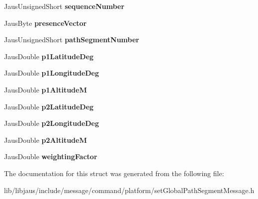 \begin{DoxyCompactItemize}
\item 
\hypertarget{struct_set_global_path_segment_message_struct_a77d09e2a5e7c9649d741216e18d5fd7a}{\-Jaus\-Unsigned\-Short {\bfseries sequence\-Number}}\label{struct_set_global_path_segment_message_struct_a77d09e2a5e7c9649d741216e18d5fd7a}

\item 
\hypertarget{struct_set_global_path_segment_message_struct_aee65fc15fa1f156df47e0302ad3783e5}{\-Jaus\-Byte {\bfseries presence\-Vector}}\label{struct_set_global_path_segment_message_struct_aee65fc15fa1f156df47e0302ad3783e5}

\item 
\hypertarget{struct_set_global_path_segment_message_struct_a3ea2f0bcc2af72850c9f4852a8bd0476}{\-Jaus\-Unsigned\-Short {\bfseries path\-Segment\-Number}}\label{struct_set_global_path_segment_message_struct_a3ea2f0bcc2af72850c9f4852a8bd0476}

\item 
\hypertarget{struct_set_global_path_segment_message_struct_ab98584847911c1f87a1583da59801956}{\-Jaus\-Double {\bfseries p1\-Latitude\-Deg}}\label{struct_set_global_path_segment_message_struct_ab98584847911c1f87a1583da59801956}

\item 
\hypertarget{struct_set_global_path_segment_message_struct_af777dcb3f6d215f126c52972905e7ef4}{\-Jaus\-Double {\bfseries p1\-Longitude\-Deg}}\label{struct_set_global_path_segment_message_struct_af777dcb3f6d215f126c52972905e7ef4}

\item 
\hypertarget{struct_set_global_path_segment_message_struct_a5945323860d7d1cea3ce2a7cdeb5eb4f}{\-Jaus\-Double {\bfseries p1\-Altitude\-M}}\label{struct_set_global_path_segment_message_struct_a5945323860d7d1cea3ce2a7cdeb5eb4f}

\item 
\hypertarget{struct_set_global_path_segment_message_struct_ae2f8a54197dd1e5d2d18546a488dbb40}{\-Jaus\-Double {\bfseries p2\-Latitude\-Deg}}\label{struct_set_global_path_segment_message_struct_ae2f8a54197dd1e5d2d18546a488dbb40}

\item 
\hypertarget{struct_set_global_path_segment_message_struct_a3752cc0821b43f2b65356d724d9b49c9}{\-Jaus\-Double {\bfseries p2\-Longitude\-Deg}}\label{struct_set_global_path_segment_message_struct_a3752cc0821b43f2b65356d724d9b49c9}

\item 
\hypertarget{struct_set_global_path_segment_message_struct_ad566f39940429f8c5661d14d92190611}{\-Jaus\-Double {\bfseries p2\-Altitude\-M}}\label{struct_set_global_path_segment_message_struct_ad566f39940429f8c5661d14d92190611}

\item 
\hypertarget{struct_set_global_path_segment_message_struct_a0b878751ebd82077aa39bd9710195c8e}{\-Jaus\-Double {\bfseries weighting\-Factor}}\label{struct_set_global_path_segment_message_struct_a0b878751ebd82077aa39bd9710195c8e}

\end{DoxyCompactItemize}


\-The documentation for this struct was generated from the following file\-:\begin{DoxyCompactItemize}
\item 
lib/libjaus/include/message/command/platform/set\-Global\-Path\-Segment\-Message.\-h\end{DoxyCompactItemize}

